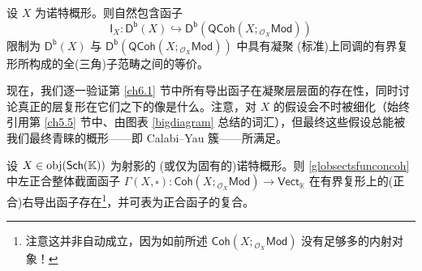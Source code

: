 \begin{Lem}\label{boundedCohinQCoh}
设 $X$ 为诺特概形。则自然包含函子
\[
\mathsf{I}_X:\mathsf{D^b}(X)\hookrightarrow\mathsf{D^b}(\mathsf{QCoh}(X;{}_{\mathcal{O}_X}\!\mathsf{Mod}))
\]
限制为 $\mathsf{D^b}(X)$ 与 $\mathsf{D^b}(\mathsf{QCoh}(X;{}_{\mathcal{O}_X}\!\mathsf{Mod}))$ 中具有凝聚 \textup(标准\textup)上同调的有界复形所构成的全\textup(三角\textup)子范畴之间的等价。
\end{Lem}

现在，我们逐一验证第 \ref{ch6.1} 节中所有导出函子在凝聚层层面的存在性，同时讨论真正的层复形在它们之下的像是什么。注意，对 $X$ 的假设会不时被细化（始终引用第 \ref{ch5.5} 节中、由图表 \eqref{bigdiagram} 总结的词汇），但最终这些假设总能被我们最终青睐的概形——即 Calabi--Yau 簇——所满足。

\begin{Pro}\label{globalsectforcoherentbdd}
设 $X\in\textup{obj}(\mathsf{Sch}(\mathbb{K}))$ 为射影的 \textup(或仅为固有的\textup)诺特概形。则 \eqref{globsectsfunconcoh} 中左正合整体截面函子 $\Gamma(X,\square):\mathsf{Coh}(X;{}_{\mathcal{O}_X}\!\mathsf{Mod})\rightarrow\mathsf{Vect}_\mathbb{K}$ 在有界复形上的\textup(正合\textup)右导出函子存在\footnote{注意这并非自动成立，因为如前所述 $\mathsf{Coh}(X;{}_{\mathcal{O}_X}\!\mathsf{Mod})$ 没有足够多的内射对象！}，并可表为正合函子的复合。
\end{Pro}

